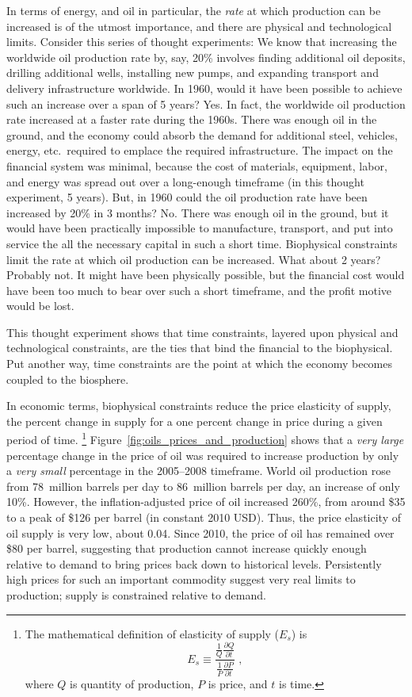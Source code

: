 In terms of energy, and oil in particular, 
the \emph{rate} at which production can be increased 
is of the utmost importance, and
there are physical and technological limits. 
Consider this series of thought experiments:
We know that increasing the worldwide oil production rate by, say, 20\% 
involves
finding additional oil deposits, 
drilling additional wells, 
installing new pumps,
and expanding transport and delivery infrastructure worldwide.
In 1960, would it have been possible to achieve such an increase 
over a span of 5 years?
Yes. 
In fact, the worldwide oil production rate increased at a faster rate 
during the 1960s.
There was enough oil in the ground, 
and the economy could absorb the demand 
for additional steel, vehicles, energy, etc.\ required to emplace
the required infrastructure.
The impact on the financial system was minimal, 
because the cost of materials, equipment, labor, and energy
was spread out over a long-enough timeframe (in this thought experiment, 5 years). 
But, in 1960 could the oil production rate have been increased 
by 20\% in 3 months?
No.
There was enough oil in the ground,
but it would have been practically impossible to manufacture,
transport, and put into service the all the necessary capital in such a short time.
Biophysical constraints limit the rate at which oil production can be increased.
What about 2 years?
Probably not.
It might have been physically possible, 
but the financial cost would have been too much to bear over such a short timeframe,
and the profit motive would be lost.

This thought experiment shows that time constraints,
layered upon physical and technological constraints, 
are the ties that bind the financial to the biophysical.
Put another way, time constraints are the point at which the economy 
becomes coupled to the biosphere.

In economic terms, biophysical constraints reduce the 
price elasticity of supply, the 
percent change in supply for a one percent change in price
during a given period of time.%
	\footnote{
	The mathematical definition of elasticity of supply ($E_s$) is
	\begin{equation*}
		E_s \equiv \frac{\frac{1}{Q}\frac{\partial Q}{\partial t}}
					{\frac{1}{P}\frac{\partial P}{\partial t}} \; ,
	\end{equation*}%
	where $Q$ is quantity of production, $P$ is price, and $t$ is time.
	}
Figure~\ref{fig:oils_prices_and_production} shows that 
a \emph{very large} percentage change in the price of oil was required to 
increase production by only a \emph{very small} percentage
in the 2005--2008 timeframe.
World oil production rose from 
78~million barrels per day to 86~million barrels per day,
an increase of only 10\%.\cite{EIA2014}
However, the inflation-adjusted price of oil increased 260\%,
from around \$35 to a peak of \$126 per barrel 
(in constant 2010 USD).
Thus, the price elasticity of oil supply is very low, about 0.04.
Since 2010, the price of oil has remained over \$80 per barrel,
suggesting that production cannot increase quickly enough relative to demand
to bring prices back down to historical levels.
Persistently high prices for such an important commodity
suggest very real limits to production; 
supply is constrained relative to demand. 

